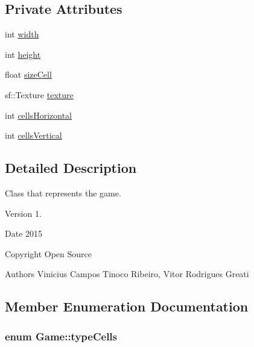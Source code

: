 \subsection*{Private Attributes}
\begin{DoxyCompactItemize}
\item 
int \hyperlink{classGame_a06b5a675d7c0f6a9b58d395872b1a4e7}{width}
\item 
int \hyperlink{classGame_aa6d1743c45de5558a0ca99078df85250}{height}
\item 
float \hyperlink{classGame_a022d477e012d53dde1affab23a93d8fc}{size\+Cell}
\item 
sf\+::\+Texture \hyperlink{classGame_a7d3e922aa6ec275e667f86056f83927e}{texture}
\item 
int \hyperlink{classGame_a17cd8aafeb1764f23847ce6b3e6d5fa7}{cells\+Horizontal}
\item 
int \hyperlink{classGame_a456a1c459655cddde0125f3a43339277}{cells\+Vertical}
\end{DoxyCompactItemize}


\subsection{Detailed Description}
Class that represents the game. 

\begin{DoxyVersion}{Version}
1. 
\end{DoxyVersion}
\begin{DoxyDate}{Date}
2015 
\end{DoxyDate}
\begin{DoxyCopyright}{Copyright}
Open Source 
\end{DoxyCopyright}
\begin{DoxyAuthor}{Authors}
Vinicius Campos Tinoco Ribeiro, Vitor Rodrigues Greati 
\end{DoxyAuthor}


\subsection{Member Enumeration Documentation}
\subsubsection[{type\+Cells}]{\setlength{\rightskip}{0pt plus 5cm}enum {\bf Game\+::type\+Cells}\hspace{0.3cm}{\ttfamily [private]}}\hypertarget{classGame_a15939429a3b6e3f068272c60a885e809}{}\label{classGame_a15939429a3b6e3f068272c60a885e809}


